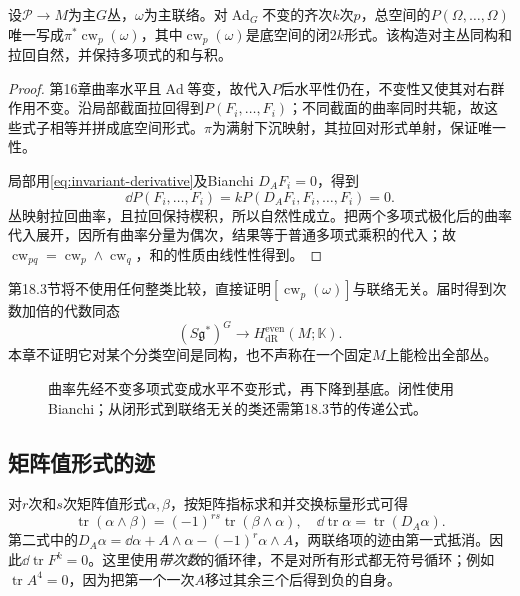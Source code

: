 \begin{theorem}\label{thm:chern-weil-closed}
设$\mathcal P\to M$为主$G$丛，$\omega$为主联络。对$\operatorname{Ad}_G$不变的齐次$k$次$p$，总空间的$P(\Omega,\ldots,\Omega)$唯一写成$\pi^*\operatorname{cw}_p(\omega)$，其中$\operatorname{cw}_p(\omega)$是底空间的闭$2k$形式。该构造对主丛同构和拉回自然，并保持多项式的和与积。
\end{theorem}
\begin{proof}
第16章曲率水平且$\operatorname{Ad}$等变，故代入$P$后水平性仍在，不变性又使其对右群作用不变。沿局部截面拉回得到$P(F_i,\ldots,F_i)$；不同截面的曲率同时共轭，故这些式子相等并拼成底空间形式。$\pi$为满射下沉映射，其拉回对形式单射，保证唯一性。

局部用\eqref{eq:invariant-derivative}及Bianchi $D_AF_i=0$，得到
\[
 \dd P(F_i,\ldots,F_i)=kP(D_AF_i,F_i,\ldots,F_i)=0.
\]
丛映射拉回曲率，且拉回保持楔积，所以自然性成立。把两个多项式极化后的曲率代入展开，因所有曲率分量为偶次，结果等于普通多项式乘积的代入；故$\operatorname{cw}_{pq}=\operatorname{cw}_p\wedge\operatorname{cw}_q$，和的性质由线性性得到。
\end{proof}
第18.3节将不使用任何整类比较，直接证明$[\operatorname{cw}_p(\omega)]$与联络无关。届时得到次数加倍的代数同态
\[
 (S\mathfrak g^*)^G\longrightarrow H^{\mathrm{even}}_{\mathrm{dR}}(M;\mathbb K).
\]
本章不证明它对某个分类空间是同构，也不声称在一个固定$M$上能检出全部丛。

\begin{figure}[htbp]
\centering
\caption{曲率先经不变多项式变成水平不变形式，再下降到基底。闭性使用Bianchi；从闭形式到联络无关的类还需第18.3节的传递公式。}
\label{fig:characteristic-descent}
\end{figure}

\subsection{矩阵值形式的迹}
对$r$次和$s$次矩阵值形式$\alpha,\beta$，按矩阵指标求和并交换标量形式可得
\[
 \operatorname{tr}(\alpha\wedge\beta)=(-1)^{rs}\operatorname{tr}(\beta\wedge\alpha),
 \quad \dd\operatorname{tr}\alpha=\operatorname{tr}(D_A\alpha).
\]
第二式中的$D_A\alpha=\dd\alpha+A\wedge\alpha-(-1)^r\alpha\wedge A$，两联络项的迹由第一式抵消。因此$\dd\operatorname{tr}F^k=0$。这里使用\emph{带次数}的循环律，不是对所有形式都无符号循环；例如$\operatorname{tr}A^4=0$，因为把第一个一次$A$移过其余三个后得到负的自身。
